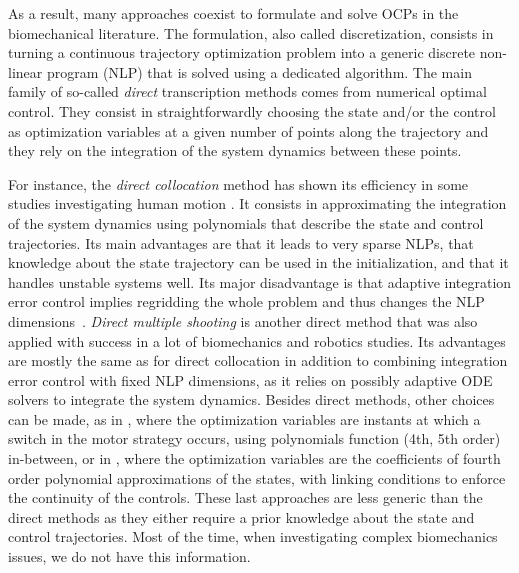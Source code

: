 As a result, many approaches coexist to formulate and solve OCPs in the biomechanical literature. 
The formulation, also called discretization, consists in turning a continuous trajectory optimization problem into a generic discrete non-linear program (NLP) that is solved using a dedicated algorithm. 
The main family of so-called \textit{direct} transcription methods comes from numerical optimal control. 
They consist in straightforwardly choosing the state and/or the control as optimization variables at a given number of points along the trajectory and they rely on the integration of the system dynamics between these points. 

For instance, the \textit{direct collocation} method has shown its efficiency in some studies investigating human motion \cite{febrer-nafriaComparisonDifferentOptimal2020, ezatiComparisonDirectCollocation2020}.
It consists in approximating the integration of the system dynamics using polynomials that describe the state and control trajectories.
Its main advantages are that it leads to very sparse NLPs, that knowledge about the state trajectory can be used in the initialization, and that it handles unstable systems well. 
Its major disadvantage is that adaptive integration error control implies regridding the whole problem and thus changes the NLP dimensions~\cite{diehl2006fast}.
\textit{Direct multiple shooting} is another direct method that was also applied with success in a lot of biomechanics \cite{koschorreck2012modeling, felis2013modeling, charbonneau2020optimal, bailly2020optimal} and robotics \cite{diehl2006fast, giftthaler2018control, bailly2018mechanical} studies.
Its advantages are mostly the same as for direct collocation in addition to combining integration error control with fixed NLP dimensions, as it relies on possibly adaptive ODE solvers to integrate the system dynamics.
Besides direct methods, other choices can be made, as in \cite{yeadon2000mechanics, begon2009effect}, where the optimization variables are instants at which a switch in the motor strategy occurs, using polynomials function (4th, 5th order) in-between, or in \cite{leboeuf2006energetic, huchez2015local}, where the optimization variables are the coefficients of fourth order polynomial approximations of the states, with linking conditions to enforce the continuity of the controls. 
These last approaches are less generic than the direct methods as they either require a prior knowledge about the state and control trajectories. 
Most of the time, when investigating complex biomechanics issues, we do not have this information. 

